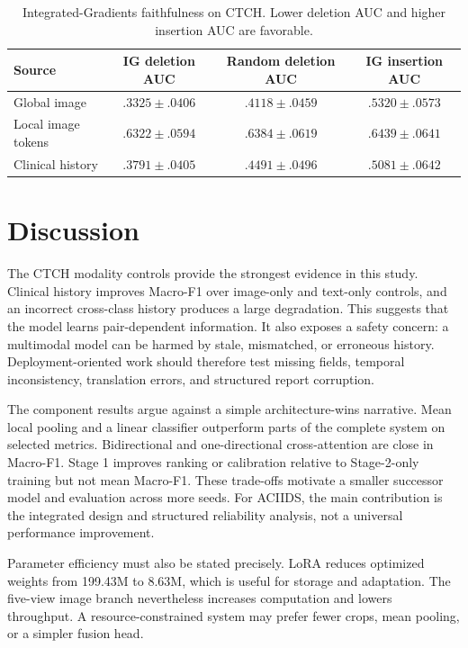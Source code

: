 \documentclass[runningheads]{llncs}
\begin{document}
\begin{table}[t]
\caption{Integrated-Gradients faithfulness on CTCH. Lower deletion AUC and higher insertion AUC are favorable.}
\label{tab:ig}
\centering
\small
\begin{tabular}{lccc}
\toprule
Source & IG deletion AUC & Random deletion AUC & IG insertion AUC \\
\midrule
Global image & $.3325\pm.0406$ & $.4118\pm.0459$ & $.5320\pm.0573$ \\
Local image tokens & $.6322\pm.0594$ & $.6384\pm.0619$ & $.6439\pm.0641$ \\
Clinical history & $.3791\pm.0405$ & $.4491\pm.0496$ & $.5081\pm.0642$ \\
\bottomrule
\end{tabular}
\end{table}

\section{Discussion}

The CTCH modality controls provide the strongest evidence in this study. Clinical history improves Macro-F1 over image-only and text-only controls, and an incorrect cross-class history produces a large degradation. This suggests that the model learns pair-dependent information. It also exposes a safety concern: a multimodal model can be harmed by stale, mismatched, or erroneous history. Deployment-oriented work should therefore test missing fields, temporal inconsistency, translation errors, and structured report corruption.

The component results argue against a simple architecture-wins narrative. Mean local pooling and a linear classifier outperform parts of the complete system on selected metrics. Bidirectional and one-directional cross-attention are close in Macro-F1. Stage 1 improves ranking or calibration relative to Stage-2-only training but not mean Macro-F1. These trade-offs motivate a smaller successor model and evaluation across more seeds. For ACIIDS, the main contribution is the integrated design and structured reliability analysis, not a universal performance improvement.

Parameter efficiency must also be stated precisely. LoRA reduces optimized weights from 199.43M to 8.63M, which is useful for storage and adaptation. The five-view image branch nevertheless increases computation and lowers throughput. A resource-constrained system may prefer fewer crops, mean pooling, or a simpler fusion head.
\end{document}
